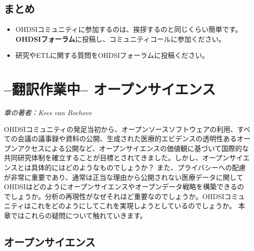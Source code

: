 \documentclass[
  11pt]{book}
\makeatletter
\providecommand{\tightlist}{%
  \setlength{\itemsep}{0pt}\setlength{\parskip}{0pt}}
\newenvironment{kframe}{%
\medskip{}
\setlength{\fboxsep}{.8em}
 \def\at@end@of@kframe{}%
 \ifinner\ifhmode%
  \def\at@end@of@kframe{\end{minipage}}%
  \begin{minipage}{\columnwidth}%
 \fi\fi%
 \def\FrameCommand##1{\hskip\@totalleftmargin \hskip-\fboxsep
 \colorbox{myShadeColor}{##1}\hskip-\fboxsep
     \hskip-\linewidth \hskip-\@totalleftmargin \hskip\columnwidth}%
 \MakeFramed {\advance\hsize-\width
   \@totalleftmargin\z@ \linewidth\hsize
   \@setminipage}}%
 {\par\unskip\endMakeFramed%
 \at@end@of@kframe}
\newenvironment{rmdblock}[1]
  {
  \begin{itemize}
  \renewcommand{\labelitemi}{
    \raisebox{-.7\height}[0pt][0pt]{
      {\setkeys{Gin}{width=3em,keepaspectratio}\texttt{[image: images/\#1]}}
    }
  }
  \setlength{\fboxsep}{1em}
  \begin{kframe}
  \item
  }
  {
  \end{kframe}
  \end{itemize}
  }
\newenvironment{rmdsummary}
  {\begin{rmdblock}{summary}}
  {\end{rmdblock}}
\theoremstyle{definition}
\theoremstyle{definition}
\theoremstyle{definition}
\theoremstyle{definition}
\theoremstyle{remark}
\makeatother
\begin{document}
\section{まとめ}\label{ux307eux3068ux3081-1}

\begin{rmdsummary}
\begin{itemize}
\tightlist
\item
  OHDSIコミュニティに参加するのは、挨拶するのと同じくらい簡単です。\textbf{OHDSIフォーラム}に投稿し、コミュニティコールに参加ください。
\item
  研究やETLに関する質問をOHDSIフォーラムに投稿ください。
\end{itemize}
\end{rmdsummary}

\chapter{--翻訳作業中-- オープンサイエンス}\label{OpenScience}


\emph{章の著者：Kees van Bochove}

OHDSIコミュニティの発足当初から、オープンソースソフトウェアの利用、すべての会議の議事録や資料の公開、生成された医療的エビデンスの透明性あるオープンアクセスによる公開など、オープンサイエンスの価値観に基づいて国際的な共同研究体制を確立することが目標とされてきました。しかし、オープンサイエンスとは具体的にはどのようなものでしょうか？ また、プライバシーへの配慮が非常に重要であり、通常は正当な理由から公開されない医療データに関してOHDSIはどのようにオープンサイエンスやオープンデータ戦略を構築できるのでしょうか。分析の再現性がなぜそれほど重要なのでしょうか。OHDSIコミュニティはこれをどのようにしてこれを実現しようとしているのでしょうか。 本章ではこれらの疑問について触れていきます。

\section{オープンサイエンス}\label{ux30aaux30fcux30d7ux30f3ux30b5ux30a4ux30a8ux30f3ux30b9}
\end{document}
